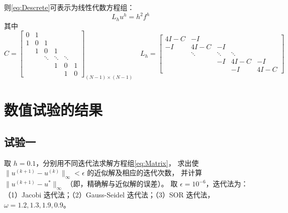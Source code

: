 \documentclass{article}
\begin{document}
则\eqref{eq:Descrete}可表示为线性代数方程组：
\begin{equation}
    L_hu^h=h^2f^h\label{eq:Matrix}
\end{equation}
其中
\begin{equation*}
    C=\begin{bmatrix}
        0&1& & & & \\
        1&0&1& & & \\
         &1&0&1& & \\
         & &\ddots&\ddots&\ddots& \\
         & & &1&0&1\\
         & & & &1&0
    \end{bmatrix}_{(N-1)\times(N-1)}\quad
    L_h=\begin{bmatrix}
        4I-C&-I& & \\
        -I&4I-C&-I& & \\
         &\ddots&\ddots&\ddots& \\
         & &-I&4I-C&-I\\
         & & &-I&4I-C
    \end{bmatrix}
\end{equation*}

\section{数值试验的结果}
\subsection{试验一}
取 $h=0.1$，分别用不同迭代法求解方程组\eqref{eq:Matrix}，
求出使 $\|u^{(k+1)}-u^{(k)}\|_{\infty}<\epsilon$ 的近似解及相应的迭代次数，
并计算 $\|u^{(k+1)}-u^{*}\|_{\infty}$ （即，精确解与近似解的误差）。
取 $\epsilon=10^{-6}$，迭代法为：
（1）Jacobi 迭代法；（2）Gauss-Seidel 迭代法；（3）SOR 迭代法，$\omega=1.2,1.3,1.9,0.9$。
\end{document}
